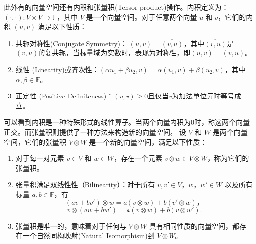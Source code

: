 此外有的向量空间还有内积和张量积(Tensor product)操作。内积定义为：\(( \cdot, \cdot ): V \times V \rightarrow \mathbb{F}\)，其中 $V$ 是一个向量空间。对于任意两个向量 $u$ 和 $v$，它们的内积 $( u, v )$ 满足以下性质：
\begin{enumerate}
    \item 共轭对称性(Conjugate Symmetry)： \(( u, v ) = \overline{( v, u )}\)，其中\(\overline{( v, u )}\)是\(( v, u )\)的复共轭，当标量域为实数时，表现为对称性，即\(( u, v ) = ( v, u )\)。
    \item 线性 (Linearity)或齐次性：\(( \alpha u_1 + \beta u_2, v ) = \alpha( u_1, v ) + \beta( u_2, v )\)，其中\(\alpha,\beta\in\mathbb{F}\)。
    \item 正定性 (Positive Definiteness)：\(( v, v ) \geq 0\)且仅当\(v \)为加法单位元时等号成立。
\end{enumerate}
可以看到内积是一种特殊形式的线性算子。当两个向量内积为$0$时，称这两个向量正交。而张量积则提供了一种方法来构造新的向量空间。
设 \(V\) 和 \(W\) 是两个向量空间，它们的张量积 \(V \otimes W\) 是一个新的向量空间，满足以下性质：
\begin{enumerate}
    \item 对于每一对元素 \(v \in V\) 和 \(w \in W\)，存在一个元素 \(v \otimes w \in V \otimes W\)，称为它们的张量积。
    \item 张量积满足双线性性（Bilinearity）：对于所有 \(v,v' \in V\)，\(w，w' \in W\) 以及所有标量 \(a,b \in \mathbb{F}\)，有
    \[
    (av + bv') \otimes w = a(v \otimes w) + b(v' \otimes w)，
    \]
    \[
    v \otimes (aw + bw') = a(v \otimes w) + b(v \otimes w').
    \]
    \item 张量积是唯一的，意味着对于任何与 \(V \otimes W\) 具有相同性质的向量空间，都存在一个自然同构映射(Natural Isomorphism)到 \(V \otimes W\)。
\end{enumerate}

